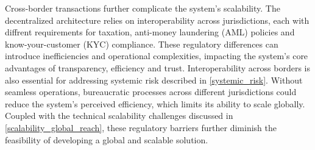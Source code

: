 Cross-border transactions further complicate the system's scalability. The decentralized architecture relies on interoperability across jurisdictions, each with diffrent requirements for taxation, anti-money laundering (AML) policies and know-your-customer (KYC) compliance. These regulatory differences can introduce inefficiencies and operational complexities, impacting the system's core advantages of transparency, efficiency and trust. Interoperability across borders is also essential for addressing systemic risk described in \cref{systemic_risk}. Without seamless operations, bureaucratic processes across different jurisdictions could reduce the system's perceived efficiency, which limits its ability to scale globally. Coupled with the technical scalability challenges discussed in \cref{scalability_global_reach}, these regulatory barriers further diminish the feasibility of developing a global and scalable solution.